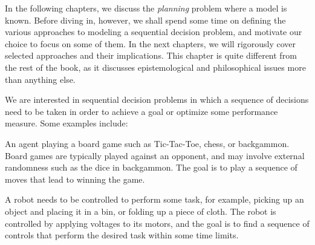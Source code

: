 In the following chapters, we discuss the \textit{planning} problem where a model is known. Before diving in, however, we shall spend some time on defining the various approaches to modeling a sequential decision problem, and motivate our choice to focus on some of them. In the next chapters, we will rigorously cover selected approaches and their implications. This chapter is quite different from the rest of the book, as it discusses epistemological and philosophical  issues more than anything else. 

We are interested in sequential decision problems in which a sequence of decisions need to be taken in order to achieve a goal or optimize some performance measure. Some examples include:
\begin{example}
    An agent playing a board game such as Tic-Tac-Toe, chess, or backgammon. Board games are typically played against an opponent, and may involve external randomness such as the dice in backgammon. The goal is to play a sequence of moves that lead to winning the game.
\end{example}

\begin{example}
    A robot needs to be controlled to perform some task, for example, picking up an object and placing it in a bin, or folding up a piece of cloth. The robot is controlled by applying voltages to its motors, and the goal is to find a sequence of controls that perform the desired task within some time limits.
\end{example}

